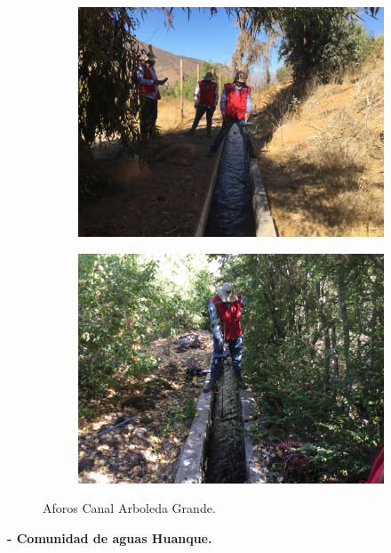 \documentclass[]{article}
\begin{document}
\begin{figure}[H]
  \centering
\begin{subfigure}{.45\textwidth}
\hfill
  \includegraphics[angle= 180, width=\textwidth]{Foto/a3.jpg}
\end{subfigure}
\hfill
\begin{subfigure}{.45\textwidth}
\hfill
  \includegraphics[angle= 180, width=\textwidth]{Foto/a4.jpg} 
\end{subfigure}
\caption{Aforos Canal Arboleda Grande.}
\end{figure}
\clearpage

\textbf{- Comunidad de aguas Huanque.}
\end{document}
